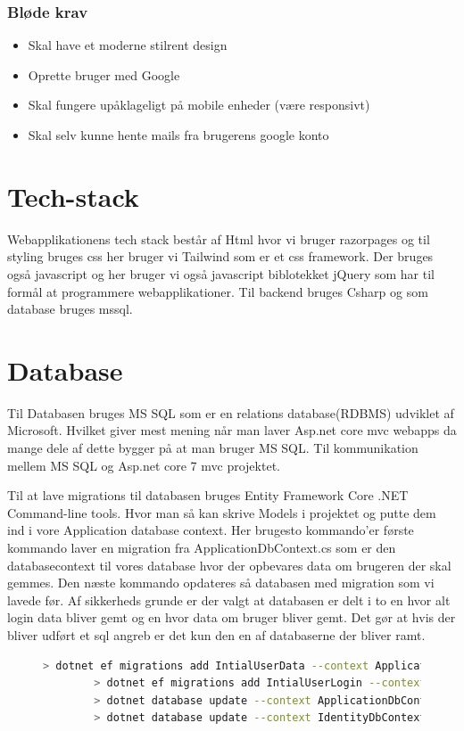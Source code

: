 \subsubsection{Bløde krav}
\begin{itemize}
    \item Skal have et moderne stilrent design
    \item Oprette bruger med Google
    \item Skal fungere upåklageligt på mobile enheder (være responsivt)
    \item Skal selv kunne hente mails fra brugerens google konto
\end{itemize}
\section{Tech-stack}
Webapplikationens tech stack består af Html hvor vi bruger razorpages og til styling bruges css her bruger vi Tailwind som er et
css framework. Der bruges også javascript og her bruger vi også javascript biblotekket jQuery som har til formål
at programmere webapplikationer. Til backend bruges Csharp og som database bruges mssql.
\section{Database}
Til Databasen bruges MS SQL som er en relations database(RDBMS) udviklet af Microsoft. Hvilket
giver mest mening når man laver Asp.net core mvc webapps da mange dele af dette bygger på at man bruger
MS SQL. Til kommunikation mellem MS SQL og Asp.net core 7 mvc projektet.    

Til at lave migrations til databasen bruges Entity Framework Core .NET Command-line tools. 
Hvor man så kan skrive Models i projektet og putte dem ind i vore Application database 
context. Her brugesto kommando'er første kommando laver en migration fra ApplicationDbContext.cs 
som er den databasecontext til vores database hvor der opbevares data om brugeren der skal gemmes. 
Den næste kommando opdateres så databasen med migration som vi lavede før. Af sikkerheds grunde er der 
valgt at databasen er delt i to en hvor alt login data bliver gemt og en hvor data om bruger bliver gemt.
Det gør at hvis der bliver udført et sql angreb er det kun den en af databaserne der bliver ramt.

\begin{figure}[!h]
    \begin{lstlisting}[language=bash]
        > dotnet ef migrations add IntialUserData --context ApplicationDbContext
        > dotnet ef migrations add IntialUserLogin --context IdentityDbContext
        > dotnet database update --context ApplicationDbContext
        > dotnet database update --context IdentityDbContext
    \end{lstlisting}
\end{figure}


